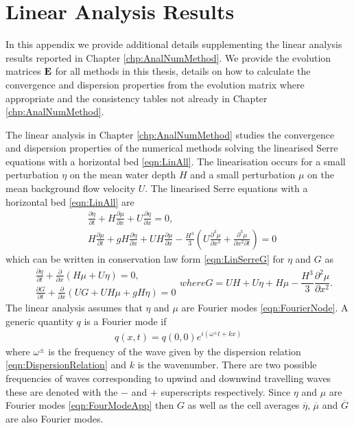 \chapter{Linear Analysis Results}
\label{app:LinAnal}
In this appendix we provide additional details supplementing the linear analysis results reported in Chapter \ref{chp:AnalNumMethod}. We provide the evolution matrices $\mathbf{E}$ for all methods in this thesis, details on how to calculate the convergence and dispersion properties from the evolution matrix where appropriate and the consistency tables not already in Chapter \ref{chp:AnalNumMethod}.

The linear analysis in Chapter \ref{chp:AnalNumMethod} studies the convergence and dispersion properties of the numerical methods solving the linearised Serre equations with a horizontal bed \eqref{eqn:LinAll}. The linearisation occurs for a small perturbation $\eta$ on the mean water depth $H$ and a small perturbation $\mu$ on the mean background flow velocity $U$. The linearised Serre equations with a horizontal bed \eqref{eqn:LinAll} are
\begin{subequations}
	\label{appC:Lin}
	\begin{align}
	&\frac{\partial  \eta}{\partial  t} + H\frac{\partial \mu}{\partial  x} + U\frac{\partial  \eta}{\partial  x}  = 0, \\
	&H\frac{\partial  \mu}{\partial  t} + gH\frac{\partial  \eta}{\partial  x} + UH\frac{\partial  \mu}{\partial  x} - \frac{H^3}{3}\left(U\frac{\partial^3  \mu}{\partial  x^3} + \frac{\partial^3  \mu}{\partial  x^2 \partial  t}  \right)  = 0
	\end{align}	
\end{subequations}
which can be written in conservation law form \eqref{eqn:LinSerreG} for $\eta$ and $G$ as
\begin{subequations}
	\label{appC:ConLawFormLin}
	\begin{align}
	&\frac{\partial  \eta}{\partial  t} +\frac{\partial}{\partial  x} \left(H\mu + U \eta\right) = 0, \\
	&\frac{\partial  G}{\partial  t} + \frac{\partial}{\partial  x}\left(UG + UH\mu + gH \eta\right) = 0
	\end{align}
	where
	\begin{equation}
	G = UH + U \eta + H \mu -\frac{H^3}{3} \frac{\partial^2 \mu }{\partial x^2}.
	\end{equation}
\end{subequations}
The linear analysis assumes that $\eta$ and $\mu$ are Fourier modes \eqref{eqn:FourierNode}. A generic quantity $q$ is a Fourier mode if
\begin{align}
q(x,t) = q(0,0) e^{i\left(\omega^\pm t + kx\right)}
\label{eqn:FourModeApp}
\end{align}
where $\omega^\pm$ is the frequency of the wave given by the dispersion relation \eqref{eqn:DispersionRelation} and $k$ is the wavenumber. There are two possible frequencies of waves corresponding to upwind and downwind travelling waves these are denoted with the $-$ and $+$ superscripts respectively. Since $\eta$ and $\mu$ are Fourier modes \eqref{eqn:FourModeApp} then $G$ as well as the cell averages $\overline{\eta}$, $\overline{\mu}$ and $\overline{G}$ are also Fourier modes.

